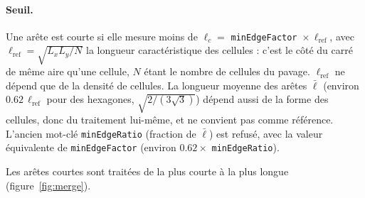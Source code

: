 \documentclass[11pt,a4paper]{article}
\newcommand{\code}[1]{\texttt{#1}}
\begin{document}
\paragraph{Seuil.} Une arête est courte si elle mesure moins de $\ell_c=$ \code{minEdgeFactor}~$\times\,\ell_{\text{ref}}$,
avec $\ell_{\text{ref}}=\sqrt{L_xL_y/N}$ la longueur caractéristique des cellules : c'est le côté du carré de même
aire qu'une cellule, $N$ étant le nombre de cellules du pavage. $\ell_{\text{ref}}$ ne dépend que de la densité de
cellules. La longueur moyenne des arêtes $\bar\ell$ (environ $0.62\,\ell_{\text{ref}}$ pour des hexagones,
$\sqrt{2/(3\sqrt3)}$) dépend aussi de la forme des cellules, donc du traitement lui-même, et ne convient pas
comme référence. L'ancien mot-clé \code{minEdgeRatio} (fraction de $\bar\ell$) est refusé, avec la valeur
équivalente de \code{minEdgeFactor} (environ $0.62\times$ \code{minEdgeRatio}).

Les arêtes courtes sont traitées de la plus courte à la plus longue (figure~\ref{fig:merge}).
\end{document}
